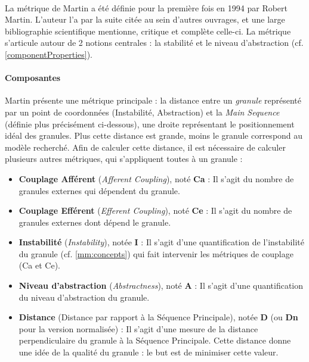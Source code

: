 \documentclass{scrartcl}
\begin{document}
    \paragraph{}La métrique de Martin a été définie pour la première fois en 1994 par Robert Martin\cite{Martin:1994}. L'auteur l'a par la suite citée au sein d'autres ouvrages\cite{Martin:2003}, et une large bibliographie scientifique mentionne, critique et complète celle-ci\cite{HyryLepp:2009}\cite{BUmetric:2016}\cite{KaurShar:2015}\cite{Spinellis:2006}\cite{Pressman:2000}. La métrique s'articule autour de 2 notions centrales : la stabilité et le niveau d'abstraction (cf. \ref{componentProperties}).


    \paragraph{Composantes}Martin présente une métrique principale : la distance entre un \textit{granule} représenté par un point de coordonnées (Instabilité, Abstraction) et la \emph{Main Sequence} (définie plus précisément ci-dessous), une droite représentant le positionnement idéal des granules. Plus cette distance est grande, moins le granule correspond au modèle recherché. Afin de calculer cette distance, il est nécessaire de calculer plusieurs autres métriques, qui s'appliquent toutes à un granule :
    \begin{itemize}
        \item \textbf{Couplage Afférent} (\emph{Afferent Coupling}), noté \textbf{Ca} : Il s'agit du nombre de granules externes qui dépendent du granule.
        \item \textbf{Couplage Efférent} (\emph{Efferent Coupling}), noté \textbf{Ce} : Il s'agit du nombre de granules externes dont dépend le granule.
        \item \textbf{Instabilité} (\emph{Instability}), notée \textbf{I} : Il s'agit d'une quantification de l'instabilité du granule (cf. \ref{mm:concepts}) qui fait intervenir les métriques de couplage (Ca et Ce).
        \item \textbf{Niveau d'abstraction} (\emph{Abstractness}), noté \textbf{A} : Il s'agit d'une quantification du niveau d'abstraction du granule.
        \item \textbf{Distance} (Distance par rapport à la Séquence Principale), notée \textbf{D} (ou \textbf{Dn} pour la version normalisée) : Il s'agit d'une mesure de la distance perpendiculaire du granule à la Séquence Principale. Cette distance donne une idée de la qualité du granule : le but est de minimiser cette valeur.
    \end{itemize}
\end{document}
